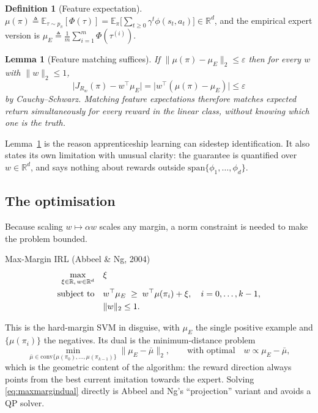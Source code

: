 \documentclass[11pt]{article}
\theoremstyle{plain}
\newtheorem{lemma}[theorem]{Lemma}
\theoremstyle{definition}
\newtheorem{definition}[theorem]{Definition}
\theoremstyle{remark}
\newcommand{\E}{\mathbb{E}}
\newcommand{\R}{\mathbb{R}}
\begin{document}
\begin{definition}[Feature expectation]
$\mu(\pi) \triangleq \E_{\tau\sim p_\pi}[\Phi(\tau)] = \E_\pi\big[\sum_{t\ge0}
\gamma^t \phi(s_t,a_t)\big] \in \R^d$, and the empirical expert version is
$\mu_E \triangleq \frac1m\sum_{i=1}^m \Phi(\tau^{(i)})$.
\end{definition}

\begin{lemma}[Feature matching suffices]\label{lem:featurematch}
If $\|\mu(\pi)-\mu_E\|_2 \le \varepsilon$ then for every $w$ with
$\|w\|_2\le1$,
\begin{equation}
\big|J_{R_w}(\pi) - w^\top \mu_E\big| = \big|w^\top(\mu(\pi)-\mu_E)\big| \le \varepsilon
\label{eq:featurematch}
\end{equation}
by Cauchy--Schwarz. \emph{Matching feature expectations therefore matches
expected return} simultaneously for every reward in the linear class,
\emph{without knowing which one is the truth.}
\end{lemma}

Lemma~\ref{lem:featurematch} is the reason apprenticeship learning can
sidestep identification. It also states its own limitation with unusual
clarity: the guarantee is quantified over $w\in\R^d$, and says nothing
about rewards outside $\mathrm{span}\{\phi_1,\ldots,\phi_d\}$.

\subsection{The optimisation}

Because scaling $w\mapsto\alpha w$ scales any margin, a norm constraint is
needed to make the problem bounded.

\begin{graybox}{Max-Margin IRL (Abbeel \& Ng, 2004)}
\begin{align}
\max_{\xi\in\R,\, w\in\R^d} \quad & \xi \notag\\
\text{subject to} \quad & w^\top \mu_E \;\ge\; w^\top \mu(\pi_i) + \xi, \quad i=0,\ldots,k-1, \label{eq:maxmargin}\\
& \|w\|_2 \le 1. \notag
\end{align}
\end{graybox}

This is the hard-margin SVM in disguise, with $\mu_E$ the single positive
example and $\{\mu(\pi_i)\}$ the negatives. Its dual is the
minimum-distance problem
\begin{equation}
\min_{\bar\mu \in \mathrm{conv}\{\mu(\pi_0),\ldots,\mu(\pi_{k-1})\}} \|\mu_E - \bar\mu\|_2,
\qquad \text{with optimal} \quad w \propto \mu_E - \bar\mu,
\label{eq:maxmargindual}
\end{equation}
which is the geometric content of the algorithm: the reward direction
always points from the best current imitation towards the expert. Solving
\eqref{eq:maxmargindual} directly is Abbeel and Ng's ``projection''
variant and avoids a QP solver.
\end{document}
